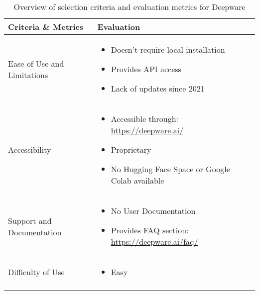 \begin{table}[htpb]
	\caption{Overview of selection criteria and evaluation metrics for Deepware}\label{tab:deepware-overview}
	\centering
	\small
	\begin{tabularx}{\textwidth}{l X}
		\toprule
		\textbf{Criteria \& Metrics} & \textbf{Evaluation}                                        \\
		\midrule
		Ease of Use and Limitations  & \begin{itemize}
			                               \item Doesn't require local installation
			                               \item Provides \ac{API} access
			                               \item Lack of updates since 2021
		                               \end{itemize}                    \\
		\addlinespace
		Accessibility                & \begin{itemize}
			                               \item Accessible through: \url{https://deepware.ai/}
			                               \item Proprietary
			                               \item No Hugging Face Space or Google Colab available
		                               \end{itemize}       \\
		\addlinespace
		Support and Documentation    & \begin{itemize}
			                               \item No User Documentation
			                               \item Provides FAQ section: \url{https://deepware.ai/faq/}
		                               \end{itemize}  \\
		\addlinespace
		Difficulty of Use            & \begin{itemize}
			                               \item Easy
		                               \end{itemize}                                             \\
		\addlinespace

\end{tabularx}
\end{table}
